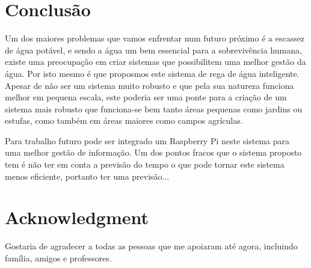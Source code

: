 \documentclass[conference]{IEEEtran}
\begin{document}


\section{Conclusão}

Um dos maiores problemas que vamos enfrentar num futuro próximo é a escassez de água potável,
e sendo a água um bem essencial para a sobrevivência humana, existe uma preocupação 
em criar sistemas que possibilitem uma melhor gestão da água. Por isto mesmo 
é que proposmos este sistema de rega de água inteligente. Apesar de não ser um 
sistema muito robusto e que pela sua natureza funciona melhor em pequena escala, este 
poderia ser uma ponte para a criação de um sistema mais robusto que funciona-se bem 
tanto áreas pequenas como jardins ou estufas, como também em áreas maiores como campos agrículas.

Para trabalho futuro pode ser integrado um Raspberry Pi neste sistema para uma melhor 
gestão de informação. Um dos pontos fracos que o sistema proposto tem é não 
ter em conta a previsão do tempo o que pode tornar este sistema menos eficiente, 
portanto ter uma previsão...

\section*{Acknowledgment}

Gostaria de agradecer a todas as pessoas que me apoiaram até agora, incluindo
família, amigos e professores.



\end{document}
